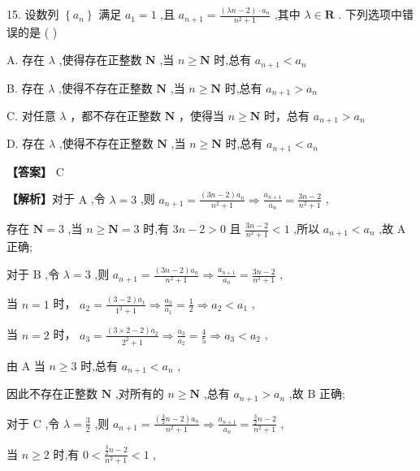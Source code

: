\documentclass[10pt]{article}
\begin{document}
15. 设数列 \(\left\{  {a}_{n}\right\}\) 满足 \({a}_{1} = 1\) ,且 \({a}_{n + 1} = \frac{\left( {{\lambda n} - 2}\right)  \cdot  {a}_{n}}{{n}^{2} + 1}\) ,其中 \(\lambda  \in  \mathbf{R}\) . 下列选项中错误的是 ( )

A. 存在 \(\lambda\) ,使得存在正整数 \(\mathbf{N}\) ,当 \(n \geq  \mathbf{N}\) 时,总有 \({a}_{n + 1} < {a}_{n}\)

B. 存在 \(\lambda\) ,使得不存在正整数 \(\mathbf{N}\) ,当 \(n \geq  \mathbf{N}\) 时,总有 \({a}_{n + 1} > {a}_{n}\)

C. 对任意 \(\lambda\) ，都不存在正整数 \(\mathbf{N}\) ，使得当 \(n \geq  \mathbf{N}\) 时，总有 \({a}_{n + 1} > {a}_{n}\)

D. 存在 \(\lambda\) ,使得不存在正整数 \(\mathbf{N}\) ,当 \(n \geq  \mathbf{N}\) 时,总有 \({a}_{n + 1} < {a}_{n}\)

\textbf{【答案】} C

\textbf{【解析】}对于 \(\mathrm{A}\) ,令 \(\lambda  = 3\) ,则 \({a}_{n + 1} = \frac{\left( {{3n} - 2}\right) {a}_{n}}{{n}^{2} + 1} \Rightarrow  \frac{{a}_{n + 1}}{{a}_{n}} = \frac{{3n} - 2}{{n}^{2} + 1}\) ,

存在 \(\mathbf{N} = 3\) ,当 \(n \geq  \mathbf{N} = 3\) 时,有 \({3n} - 2 > 0\) 且 \(\frac{{3n} - 2}{{n}^{2} + 1} < 1\) ,所以 \({a}_{n + 1} < {a}_{n}\) ,故 \(\mathrm{A}\) 正确;

对于 \(\mathrm{B}\) ,令 \(\lambda  = 3\) ,则 \({a}_{n + 1} = \frac{\left( {{3n} - 2}\right) {a}_{n}}{{n}^{2} + 1} \Rightarrow  \frac{{a}_{n + 1}}{{a}_{n}} = \frac{{3n} - 2}{{n}^{2} + 1}\) ,

当 \(n = 1\) 时， \({a}_{2} = \frac{\left( {3 - 2}\right) {a}_{1}}{{1}^{2} + 1} \Rightarrow  \frac{{a}_{2}}{{a}_{1}} = \frac{1}{2} \Rightarrow  {a}_{2} < {a}_{1}\) ,

当 \(n = 2\) 时， \({a}_{3} = \frac{\left( {3 \times  2 - 2}\right) {a}_{2}}{{2}^{2} + 1} \Rightarrow  \frac{{a}_{3}}{{a}_{2}} = \frac{4}{5} \Rightarrow  {a}_{3} < {a}_{2}\) ,

由 \(\mathrm{A}\) 当 \(n \geq  3\) 时,总有 \({a}_{n + 1} < {a}_{n}\) ,

因此不存在正整数 \(\mathbf{N}\) ,对所有的 \(n \geq  \mathbf{N}\) ,总有 \({a}_{n + 1} > {a}_{n}\) ,故 \(\mathrm{B}\) 正确;

对于 \(\mathrm{C}\) ,令 \(\lambda  = \frac{3}{2}\) ,则 \({a}_{n + 1} = \frac{\left( {\frac{3}{2}n - 2}\right) {a}_{n}}{{n}^{2} + 1} \Rightarrow  \frac{{a}_{n + 1}}{{a}_{n}} = \frac{\frac{3}{2}n - 2}{{n}^{2} + 1}\) ,

当 \(n \geq  2\) 时,有 \(0 < \frac{\frac{3}{2}n - 2}{{n}^{2} + 1} < 1\) ,
\end{document}
